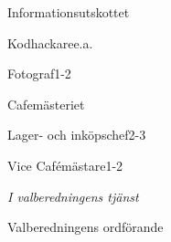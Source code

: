 \documentclass[../main/handlingar.tex]{subfiles}
\begin{document}

\begin{valforslagslista}
    \begin{utskott}{Informationsutskottet}
        \begin{post}{Kodhackare}{e.a.}
        \end{post}
        \begin{post}{Fotograf}{1-2}
        \end{post}
    \end{utskott}
    \begin{utskott}{Cafemästeriet}
        \begin{post}{Lager- och inköpschef}{2-3}
        \end{post}
        \begin{post}{Vice Cafémästare}{1-2}
        \end{post}
    \end{utskott}
\end{valforslagslista}

\begin{signatures}{1}
\emph{I valberedningens tjänst}
\signature{Elin Magnusson}{Valberedningens ordförande}
\end{signatures}
\end{document}
